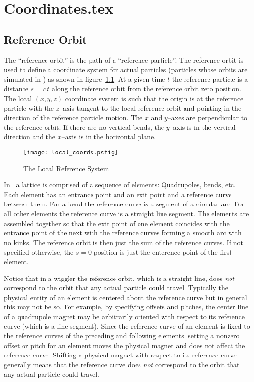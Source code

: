 \chapter{Coordinates.tex}

\section{Reference Orbit}
\label{sec:ref}

The ``reference orbit'' is the path of a ``reference particle''.  The
reference orbit is used to define a coordinate system for actual
particles (particles whose orbits are simulated in \bmad) as shown in
figure~\ref{f:local_coords}. At a given time $t$ the reference
particle is a distance $s = c \, t$ along the reference orbit from the
reference orbit zero position. The local $(x, y, z)$ coordinate system
is such that the origin is at the reference particle with the
$z$--axis tangent to the local reference orbit and pointing in the
direction of the reference particle motion. The $x$ and $y$--axes are
perpendicular to the reference orbit. If there are no vertical bends,
the $y$--axis is in the vertical direction and the $x$--axis is in the
horizontal plane.

\begin{figure}[tb]
\centering
\texttt{[image: local\_coords.psfig]}
\caption{The Local Reference System}
\label{f:local_coords}
\end{figure}

In \bmad\ a lattice is comprised of a sequence of elements:
Quadrupoles, bends, etc. Each element has an entrance point and an
exit point and a reference curve between them. For a bend the
reference curve is a segment of a circular arc. For all other elements
the reference curve is a straight line segment. The elements are assembled
together so that the exit point of one element coincides with the
entrance point of the next with the reference curves forming a smooth
arc with no kinks. The reference orbit is then just the sum of the
reference curves. If not specified otherwise, the $s = 0$ position is
just the enterence point of the first element.

Notice that in a wiggler the reference orbit, which is a straight
line, does {\em not} correspond to the orbit that any actual particle
could travel. Typically the physical entity of an element is centered
about the reference curve but in general this may not be so. For
example, by specifying offsets and pitches, the center line of a
quadrupole magnet may be arbitrarily oriented with respect to its
reference curve (which is a line segment). Since the reference curve
of an element is fixed to the reference curves of the preceding and
following elements, setting a nonzero offset or pitch for an element
moves the physical magnet and does not affect the reference
curve. Shifting a physical magnet with respect to its reference curve
generally means that the reference curve does {\em not} correspond to
the orbit that any actual particle could travel.


